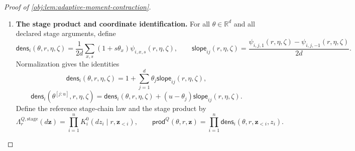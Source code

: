 \documentclass[11pt]{article}
\begin{document}
\begin{proof}[Proof of \cref{obj:lem:adaptive-moment-contraction}]
\begin{enumerate}
Define the measurable good set
\[
\begin{split}
\mathcal G_i
=\biggl\{(r,\eta,\zeta):\;&
 \sum_{x,s}\psi^{\mathrm{raw}}_{i,x,s}(r,\eta,\zeta)=2d,\\
&\psi^{\mathrm{raw}}_{i,x,s}(r,\eta,\zeta)
 \le e^\varepsilon\psi^{\mathrm{raw}}_{i,x',s'}(r,\eta,\zeta)
 \ \text{for all }x,s,x',s'\biggr\},
\end{split}
\]
and set, on their full domains,
\[
\psi_{i,x,s}(r,\eta,\zeta)
=
\begin{cases}
\psi^{\mathrm{raw}}_{i,x,s}(r,\eta,\zeta),
 &(r,\eta,\zeta)\in\mathcal G_i,\\
1,&(r,\eta,\zeta)\notin\mathcal G_i.
\end{cases}
\]
For each \(r,\eta\), the good set has full reference measure. Hence this repair preserves every represented kernel and gives, everywhere,
\[
\sum_{x,s}\psi_{i,x,s}=2d,
\qquad
\psi_{i,x,s}\le e^\varepsilon\psi_{i,x',s'}.
\]
Summing the second inequality first over the left-hand input and then over the right-hand input yields
\[
2d\le 2d\,e^\varepsilon\psi_{i,x,s},
\qquad
2d\,\psi_{i,x,s}\le e^\varepsilon\sum_{x',s'}\psi_{i,x',s'}
=2d\,e^\varepsilon.
\]
Therefore
\[
e^{-\varepsilon}\le\psi_{i,x,s}(r,\eta,\zeta)\le e^\varepsilon
\qquad\text{everywhere}.
\]

\item \textbf{The stage product and coordinate identification.}
For all \(\theta\in\mathbb R^d\) and all declared stage arguments, define
\[
\mathsf{dens}_i(\theta,r,\eta,\zeta)
=
\frac1{2d}\sum_{x,s}(1+s\theta_x)\psi_{i,x,s}(r,\eta,\zeta),
\qquad
\mathsf{slope}_{ij}(r,\eta,\zeta)
=
\frac{\psi_{i,j,1}(r,\eta,\zeta)
      -\psi_{i,j,-1}(r,\eta,\zeta)}{2d}.
\]
Normalization gives the identities
\[
\mathsf{dens}_i(\theta,r,\eta,\zeta)
=1+\sum_{j=1}^d\theta_j\mathsf{slope}_{ij}(r,\eta,\zeta),
\]
\[
\mathsf{dens}_i(\theta^{[j:u]},r,\eta,\zeta)
=
\mathsf{dens}_i(\theta,r,\eta,\zeta)
+(u-\theta_j)\mathsf{slope}_{ij}(r,\eta,\zeta).
\]
Define the reference stage-chain law and the stage product by
\[
\Lambda_r^{Q,\mathrm{stage}}(d\mathbf z)
=\prod_{i=1}^n K_i^0(dz_i\mid r,\mathbf z_{<i}),
\qquad
\mathsf{prod}^Q(\theta,r,\mathbf z)
=\prod_{i=1}^n
 \mathsf{dens}_i(\theta,r,\mathbf z_{<i},z_i).
\]


\end{enumerate}
\end{proof}
\end{document}
